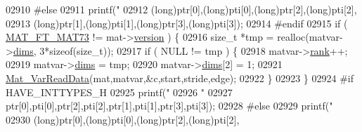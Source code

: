 \begin{DoxyCode}
{{{{{{{{{{{{{{{{{{02910 \textcolor{preprocessor}{#else}
02911                         printf(\textcolor{stringliteral}{"%
02912                             (\textcolor{keywordtype}{long})ptr[0],(\textcolor{keywordtype}{long})pti[0],(\textcolor{keywordtype}{long})ptr[2],(\textcolor{keywordtype}{long})pti[2],
02913                             (\textcolor{keywordtype}{long})ptr[1],(\textcolor{keywordtype}{long})pti[1],(\textcolor{keywordtype}{long})ptr[3],(\textcolor{keywordtype}{long})pti[3]);
02914 \textcolor{preprocessor}{#endif}
02915                         \textcolor{keywordflow}{if} ( \hyperlink{group___m_a_t_ggad03442b8378999189d510e3745c702b7a765c5d1d5038947646260dc82483517e}{MAT\_FT\_MAT73} != mat->\hyperlink{struct__mat__t_a729c2bc0afc97485057a5af425635b1a}{version} ) \{
02916                             \textcolor{keywordtype}{size\_t} *tmp = realloc(matvar->\hyperlink{group___m_a_t_a8e01234e1c862ce3472bb37f5a09b92c}{dims}, 3*\textcolor{keyword}{sizeof}(\textcolor{keywordtype}{size\_t}));
02917                             \textcolor{keywordflow}{if} ( NULL != tmp ) \{
02918                                 matvar->\hyperlink{group___m_a_t_a84ba70c96ded13cc555fa75b768d9921}{rank}++;
02919                                 matvar->\hyperlink{group___m_a_t_a8e01234e1c862ce3472bb37f5a09b92c}{dims} = tmp;
02920                                 matvar->\hyperlink{group___m_a_t_a8e01234e1c862ce3472bb37f5a09b92c}{dims}[2] = 1;
02921                                 \hyperlink{group___m_a_t_ga1845000f4fc6252ec5ff11c4b9f0759f}{Mat\_VarReadData}(mat,matvar,&c,start,stride,edge);
02922                             \}
02923                         \}
02924 \textcolor{preprocessor}{#if HAVE\_INTTYPES\_H}
02925                         printf(\textcolor{stringliteral}{"%
02926                             \textcolor{stringliteral}{"%
02927                             ptr[0],pti[0],ptr[2],pti[2],ptr[1],pti[1],ptr[3],pti[3]);
02928 \textcolor{preprocessor}{#else}
02929                         printf(\textcolor{stringliteral}{"%
02930                             (\textcolor{keywordtype}{long})ptr[0],(\textcolor{keywordtype}{long})pti[0],(\textcolor{keywordtype}{long})ptr[2],(\textcolor{keywordtype}{long})pti[2],
}}}}}}}}}}}}}}}}}}}}}}
\end{DoxyCode}

